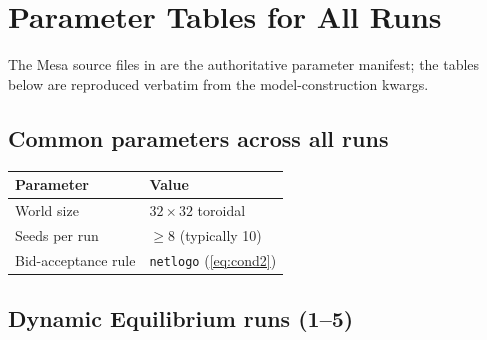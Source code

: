 \section{Parameter Tables for All Runs}
\label{app:params}

The Mesa source files in  are the
authoritative parameter manifest; the tables below are reproduced
verbatim from the model-construction kwargs.

\subsection{Common parameters across all runs}

\begin{table}[h]
\centering
\small
\begin{tabular}{l l}
\toprule
\textbf{Parameter} & \textbf{Value} \\
\midrule
World size                  & $32 \times 32$ toroidal \\
Seeds per run               & $\ge 8$ (typically 10) \\
Bid-acceptance rule         & \texttt{netlogo} (\cref{eq:cond2}) \\
\bottomrule
\end{tabular}
\end{table}

\subsection{Dynamic Equilibrium runs (1--5)}


